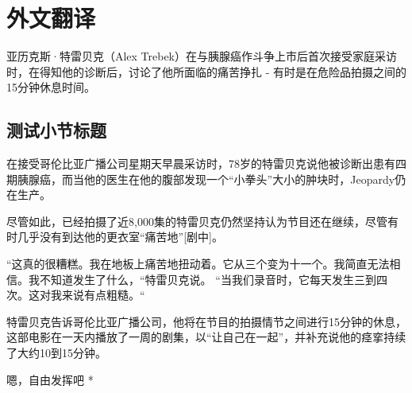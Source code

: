 \section{外文翻译}
亚历克斯·特雷贝克（Alex Trebek）在与胰腺癌作斗争上市后首次接受家庭采访时，在得知他的诊断后，讨论了他所面临的痛苦挣扎 - 有时是在危险品拍摄之间的15分钟休息时间。

\subsection{测试小节标题}
在接受哥伦比亚广播公司星期天早晨采访时，78岁的特雷贝克说他被诊断出患有四期胰腺癌，而当他的医生在他的腹部发现一个“小拳头”大小的肿块时，Jeopardy仍在生产。

尽管如此，已经拍摄了近8,000集的特雷贝克仍然坚持认为节目还在继续，尽管有时几乎没有到达他的更衣室“痛苦地”[剧中]。

“这真的很糟糕。我在地板上痛苦地扭动着。它从三个变为十一个。我简直无法相信。我不知道发生了什么，“特雷贝克说。 “当我们录音时，它每天发生三到四次。这对我来说有点粗糙。“

特雷贝克告诉哥伦比亚广播公司，他将在节目的拍摄情节之间进行15分钟的休息，这部电影在一天内播放了一周的剧集，以“让自己在一起”，并补充说他的痉挛持续了大约10到15分钟。


\par * 嗯，自由发挥吧 * \par